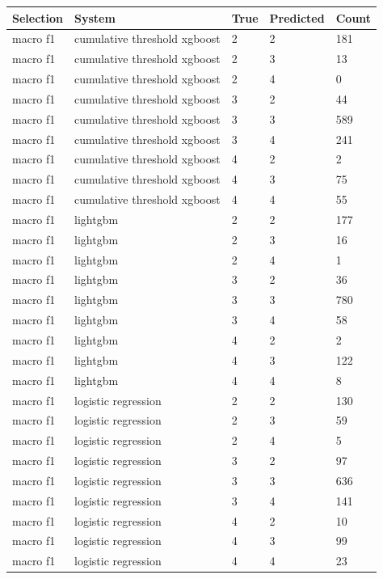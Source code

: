 \documentclass[
  a4paper,
  review]{elsarticle}
\newcounter{none} %
\begin{document}
{\def\LTcaptype{none} %
\begingroup\scriptsize
\begin{longtable}[]{@{}lllll@{}}
\toprule\noalign{}
Selection & System & True & Predicted & Count \\
\midrule\noalign{}
\endhead
\bottomrule\noalign{}
\endlastfoot
macro f1 & cumulative threshold xgboost & 2 & 2 & 181 \\
macro f1 & cumulative threshold xgboost & 2 & 3 & 13 \\
macro f1 & cumulative threshold xgboost & 2 & 4 & 0 \\
macro f1 & cumulative threshold xgboost & 3 & 2 & 44 \\
macro f1 & cumulative threshold xgboost & 3 & 3 & 589 \\
macro f1 & cumulative threshold xgboost & 3 & 4 & 241 \\
macro f1 & cumulative threshold xgboost & 4 & 2 & 2 \\
macro f1 & cumulative threshold xgboost & 4 & 3 & 75 \\
macro f1 & cumulative threshold xgboost & 4 & 4 & 55 \\
macro f1 & lightgbm & 2 & 2 & 177 \\
macro f1 & lightgbm & 2 & 3 & 16 \\
macro f1 & lightgbm & 2 & 4 & 1 \\
macro f1 & lightgbm & 3 & 2 & 36 \\
macro f1 & lightgbm & 3 & 3 & 780 \\
macro f1 & lightgbm & 3 & 4 & 58 \\
macro f1 & lightgbm & 4 & 2 & 2 \\
macro f1 & lightgbm & 4 & 3 & 122 \\
macro f1 & lightgbm & 4 & 4 & 8 \\
macro f1 & logistic regression & 2 & 2 & 130 \\
macro f1 & logistic regression & 2 & 3 & 59 \\
macro f1 & logistic regression & 2 & 4 & 5 \\
macro f1 & logistic regression & 3 & 2 & 97 \\
macro f1 & logistic regression & 3 & 3 & 636 \\
macro f1 & logistic regression & 3 & 4 & 141 \\
macro f1 & logistic regression & 4 & 2 & 10 \\
macro f1 & logistic regression & 4 & 3 & 99 \\
macro f1 & logistic regression & 4 & 4 & 23 \\

\end{longtable}}
\end{document}
